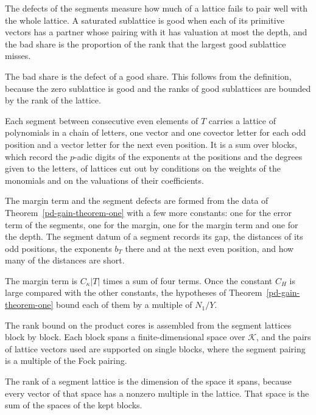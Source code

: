 The defects of the segments measure how much of a lattice fails to pair well with the whole lattice.
A saturated sublattice is good when each of its primitive vectors has a partner whose pairing with it
has valuation at most the depth, and the bad share is the proportion of the rank that the largest
good sublattice misses.

The bad share is the defect of a good share. This follows from the definition, because the zero
sublattice is good and the ranks of good sublattices are bounded by the rank of the lattice.

Each segment between consecutive even elements of $T$ carries a lattice of polynomials in a chain of
letters, one vector and one covector letter for each odd position and a vector letter for the next even
position. It is a sum over blocks, which record the $p$-adic digits of the exponents at the positions
and the degrees given to the letters, of lattices cut out by conditions on the weights of the
monomials and on the valuations of their coefficients.

The margin term and the segment defects are formed from the data of
Theorem~\ref{pd-gain-theorem-one} with a few more constants: one for the error term of the segments, one
for the margin, one for the margin term and one for the depth. The segment datum of a segment records
its gap, the distances of its odd positions, the exponents $b_T$ there and at the next even position, and
how many of the distances are short.

The margin term is $C_\kappa|T|$ times a sum of four terms. Once the constant $C_H$ is large compared
with the other constants, the hypotheses of Theorem~\ref{pd-gain-theorem-one} bound each of them by a
multiple of $N_1/Y$.

The rank bound on the product cores is assembled from the segment lattices block by block. Each block
spans a finite-dimensional space over $\mathcal K$, and the pairs of lattice vectors used are supported
on single blocks, where the segment pairing is a multiple of the Fock pairing.

The rank of a segment lattice is the dimension of the space it spans, because every vector of that
space has a nonzero multiple in the lattice. That space is the sum of the spaces of the kept blocks.

